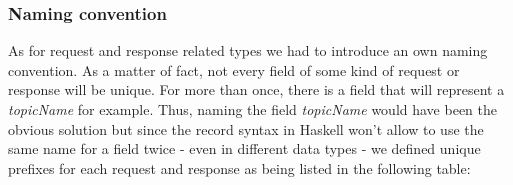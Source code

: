 






\subsubsection{Naming convention}
As for request and response related types we had to introduce an own naming
convention. As a matter of fact, not every field of some kind of request or
response will be unique. For more than once, there is a field that will
represent a \textit{topicName} for example. Thus, naming the field \textit{
topicName} would have been the obvious solution but since the record syntax in
Haskell won't allow to use the same name for a field twice - even in different
data types - we defined unique prefixes for each request and response as being
listed in the following table:

